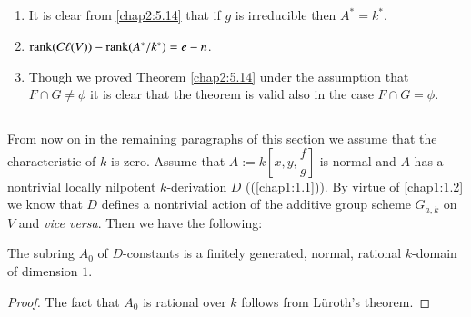\subsection{}\label{chap2:5.15}
\begin{remarks*}
  \begin{enumerate}
    \renewcommand{\labelenumi}{(\theenumi)}
  \item It is clear from \ref{chap2:5.14} that if $g$ is irreducible then
    $A^{\ast}=k^{\ast}$. 
    
  \item $\operatorname{rank}(C\ell(V))-\operatorname{rank}(A^{\ast}/k^{\ast})=e-n$.
    
  \item Though we proved Theorem \ref{chap2:5.14} under the assumption that
    $F\cap G\neq \phi$ it is clear that the theorem is valid also in the
    case $F\cap G=\phi$.
  \end{enumerate}
\end{remarks*}

\subsection{}\label{chap2:5.16}
From now on in the remaining paragraphs of this section we assume that
the characteristic of $k$ is zero. Assume that
$A:=k[x,y,\dfrac{f}{g}]$ is normal and $A$ has a nontrivial locally
nilpotent $k$-derivation $D$ (\cf (\ref{chap1:1.1})). By virtue of
\ref{chap1:1.2} we know that $D$ defines a nontrivial action of the
additive group scheme $G_{a,k}$ on $V$ and {\em vice versa}. Then we
have the following:

\begin{lemma*}[\cf \ref{chap1:1.3.1}, \ref{chap1:1.6} ]
The subring $A_{0}$ of $D$-constants is a finitely generated, normal,
rational $k$-domain of dimension $1$.
\end{lemma*}

\begin{proof}
The fact that $A_{0}$ is rational over $k$ follows from L\"uroth's theorem.
\end{proof}

